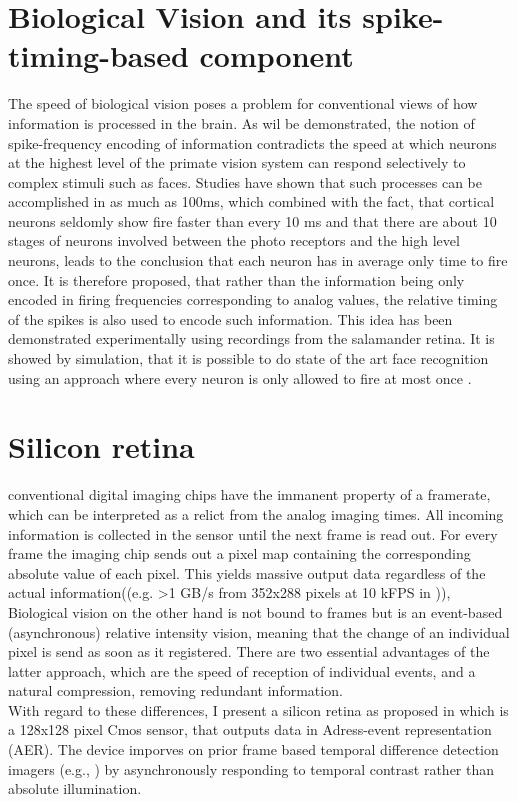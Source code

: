 \documentclass{SeminarV2}
\begin{document}
\section{Biological Vision and its spike-timing-based component} 
The speed of biological vision poses a problem for conventional views of how information is processed in the brain.
As wil be demonstrated, the notion of spike-frequency encoding of information contradicts the speed at which neurons at the highest 
level of the primate vision system can respond selectively to complex stimuli such as faces.
Studies have shown that such processes can be accomplished in as much as 100ms, which combined with the fact, that cortical neurons seldomly show fire faster than every 10 ms and that there are about 10 stages of neurons involved between the photo receptors and the high level neurons, leads to the conclusion that each neuron has in average only time to fire once.
It is therefore proposed, that rather than the information being only encoded in firing frequencies corresponding to analog values,
the relative timing of the spikes is also used to encode such information.\cite{thorpe_biological_1989}\cite{bialek_reading_1991}\cite{gerstner_why_1993}
This idea has been demonstrated experimentally using recordings from the salamander retina\cite{gollisch_rapid_2008}.
It is showed by simulation, that it is possible to do state of the art face recognition using an approach 
where every neuron is only allowed to fire at most once \cite{thorpe_spike-based_2012}.
\section{Silicon retina}
conventional digital imaging chips have the immanent property of a framerate, which can be interpreted as a relict from the analog imaging times. All incoming information is collected in the sensor until the next frame is read out. For every frame the imaging chip sends out a pixel map containing the corresponding absolute value of each pixel. This yields massive output data regardless of the actual information((e.g. >1 GB/s from 352x288 pixels at 10 kFPS in \cite{kleinfelder_10000_2001})),   Biological vision on the other hand is not bound to frames but is an event-based (asynchronous) relative intensity vision, meaning that the change of an individual pixel is send as soon as it registered. There are two essential advantages of the latter approach, which are the speed of reception of individual events, and a natural compression, removing redundant information.\\
With regard to these differences, I present a silicon retina as proposed in \cite{lichtsteiner_128_2008} which is a 128x128 pixel Cmos sensor, that outputs data in Adress-event representation (AER). The device imporves on prior frame based temporal
difference detection imagers (e.g., \cite{mallik_temporal_2005}) by asynchronously responding to temporal contrast rather than absolute illumination.
\end{document}
